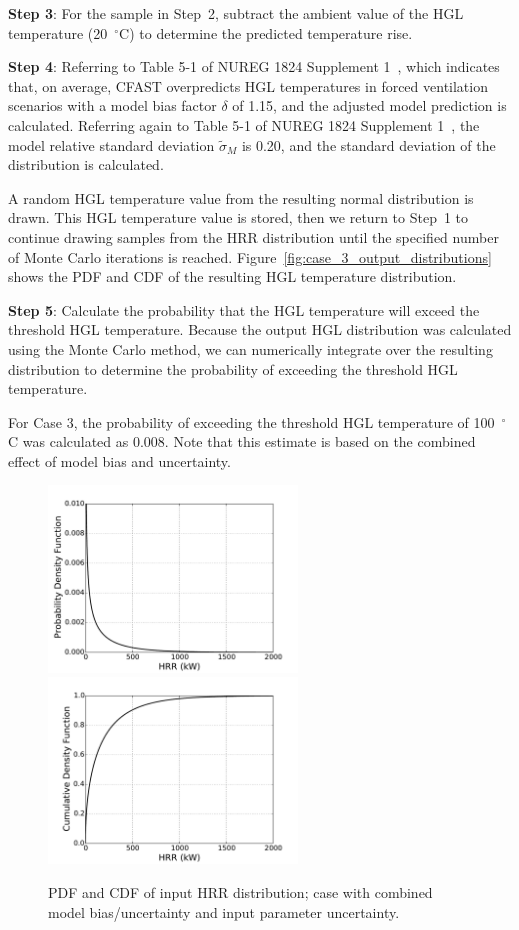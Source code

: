 \documentclass[12pt]{article}
\begin{document}
\textbf{Step 3}: For the sample in Step~2, subtract the ambient value of the HGL temperature (20~$^\circ$C) to determine the predicted temperature rise.

\textbf{Step 4}: Referring to Table 5-1 of NUREG 1824 Supplement 1~\cite{NUREG_1824_Sup_1}, which indicates that, on average, CFAST overpredicts HGL temperatures in forced ventilation scenarios with a model bias factor $\delta$ of 1.15, and the adjusted model prediction is calculated. Referring again to Table 5-1 of NUREG 1824 Supplement 1~\cite{NUREG_1824_Sup_1}, the model relative standard deviation $\widetilde\sigma_M$ is 0.20, and the standard deviation of the distribution is calculated.

A random HGL temperature value from the resulting normal distribution is drawn. This HGL temperature value is stored, then we return to Step~1 to continue drawing samples from the HRR distribution until the specified number of Monte Carlo iterations is reached. Figure~\ref{fig:case_3_output_distributions} shows the PDF and CDF of the resulting HGL temperature distribution.

\textbf{Step 5}: Calculate the probability that the HGL temperature will exceed the threshold HGL temperature. Because the output HGL distribution was calculated using the Monte Carlo method, we can numerically integrate over the resulting distribution to determine the probability of exceeding the threshold HGL temperature.

For Case 3, the probability of exceeding the threshold HGL temperature of 100~$^\circ$C was calculated as 0.008. Note that this estimate is based on the combined effect of model bias and uncertainty.


\clearpage


\begin{figure}[p]
\includegraphics[width=2.6in]{Figures/input_PDF}
\includegraphics[width=2.6in]{Figures/input_CDF}
\caption{PDF and CDF of input HRR distribution; case with combined model bias/uncertainty and input parameter uncertainty.}
\label{fig:case_3_input_distributions}
\end{figure}
\end{document}
